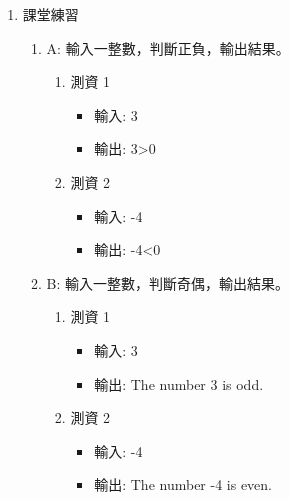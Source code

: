 \documentclass[a4paper,12pt]{article}
\begin{document}
\begin{enumerate}
\item 課堂練習
\label{CPP_ifelse_practice1}
\begin{enumerate}
\item A: 輸入一整數，判斷正負，輸出結果。
\label{sec:org4a141b9}
\begin{enumerate}
\item 測資 1
\label{sec:orgfcef482}
\begin{itemize}
\item 輸入: 3\\
\item 輸出: 3>0\\
\end{itemize}
\item 測資 2
\label{sec:org014645b}
\begin{itemize}
\item 輸入: -4\\
\item 輸出: -4<0\\
\end{itemize}
\end{enumerate}
\item B: 輸入一整數，判斷奇偶，輸出結果。
\label{sec:org290b754}
\begin{enumerate}
\item 測資 1
\label{sec:org2b2e5fe}
\begin{itemize}
\item 輸入: 3\\
\item 輸出: The number 3 is odd.\\
\end{itemize}
\item 測資 2
\label{sec:org7f69a42}
\begin{itemize}
\item 輸入: -4\\
\item 輸出: The number -4 is even.\\
\end{itemize}
\end{enumerate}
\end{enumerate}
\end{enumerate}
\end{document}
